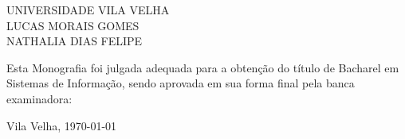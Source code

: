
%
% 
%
\begin{folhadeaprovacao}


\begin{center}


            {UNIVERSIDADE VILA VELHA} \\
           

    \vspace{1.5cm}
                                    {LUCAS MORAIS GOMES \\ NATHALIA DIAS FELIPE}\\
    \bfseries{}
\end{center}

Esta Monografia foi julgada adequada para a obten\c{c}\~{a}o do título  de Bacharel em Sistemas de Informação, sendo aprovada em sua forma final  pela banca examinadora:

    \vspace{2.5cm}
    \vfill

    \begin{center}
        Vila Velha, \today{}
    \end{center}
  
\end{folhadeaprovacao}
